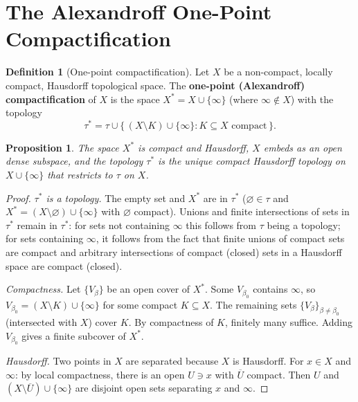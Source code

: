 \documentclass[11pt,a4paper,twoside]{book}
\newtheorem{proposition}[theorem]{Proposition}
\theoremstyle{remark}
\theoremstyle{definition}
\theoremstyle{definition}
\newtheorem{definition}{Definition}[section]
\begin{document}
\section{The Alexandroff One-Point Compactification}
\label{sec:alexandroff}

\begin{definition}[One-point compactification]\label{def:one-point-compact}
Let $X$ be a non-compact, locally compact, Hausdorff topological space.  The
\textbf{one-point (Alexandroff) compactification} of $X$ is the space
$X^* = X \cup \{\infty\}$ (where $\infty \notin X$) with the topology
\[
  \tau^* = \tau \cup \bigl\{\, (X \setminus K) \cup \{\infty\} :
    K \subseteq X \text{ compact} \,\bigr\}.
\]
\end{definition}

\begin{proposition}\label{prop:alexandroff-properties}
The space $X^*$ is compact and Hausdorff, $X$ embeds as an open dense subspace,
and the topology $\tau^*$ is the unique compact Hausdorff topology on
$X \cup \{\infty\}$ that restricts to $\tau$ on $X$.
\end{proposition}

\begin{proof}
\emph{$\tau^*$ is a topology.}  The empty set and $X^*$ are in $\tau^*$
($\varnothing \in \tau$ and $X^* = (X \setminus \varnothing) \cup \{\infty\}$
with $\varnothing$ compact).  Unions and finite intersections of sets in
$\tau^*$ remain in $\tau^*$: for sets not containing $\infty$ this follows from
$\tau$ being a topology; for sets containing $\infty$, it follows from the fact
that finite unions of compact sets are compact and arbitrary intersections of
compact (closed) sets in a Hausdorff space are compact (closed).

\emph{Compactness.}
Let $\{V_\beta\}$ be an open cover of $X^*$.  Some $V_{\beta_0}$ contains
$\infty$, so $V_{\beta_0} = (X \setminus K) \cup \{\infty\}$ for some compact
$K \subseteq X$.  The remaining sets $\{V_\beta\}_{\beta \neq \beta_0}$ (intersected
with $X$) cover $K$.  By compactness of $K$, finitely many suffice.  Adding
$V_{\beta_0}$ gives a finite subcover of $X^*$.

\emph{Hausdorff.}
Two points in $X$ are separated because $X$ is Hausdorff.  For $x \in X$ and
$\infty$:  by local compactness, there is an open $U \ni x$ with $\overline{U}$
compact.  Then $U$ and $(X \setminus \overline{U}) \cup \{\infty\}$ are
disjoint open sets separating $x$ and $\infty$.
\end{proof}
\end{document}
